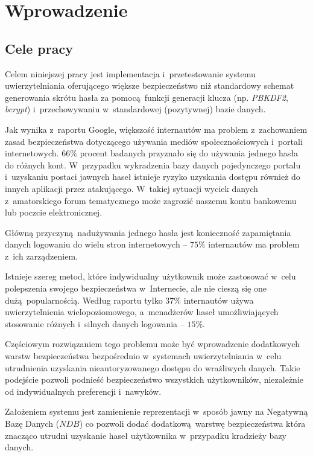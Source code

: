 \chapter{Wprowadzenie}
\section{Cele pracy}
Celem niniejszej pracy jest implementacja i~przetestowanie systemu uwierzytelniania oferującego większe bezpieczeństwo
niż standardowy schemat generowania skrótu hasła za pomocą funkcji generacji klucza (np. \textit{PBKDF2}, \textit{bcrypt})
i~przechowywaniu w~standardowej (pozytywnej) bazie danych.
    
Jak wynika z~raportu Google\cite{google-poll}, większość internautów ma problem z~zachowaniem zasad bezpieczeństwa dotyczącego 
używania mediów społecznościowych i~portali internetowych. $66\%$ procent badanych przyznało się do używania jednego hasła do różnych kont. 
W~przypadku wykradzenia bazy danych pojedynczego portalu i~uzyskaniu postaci jawnych haseł istnieje ryzyko uzyskania dostępu również do innych aplikacji
przez atakującego. W~takiej sytuacji wyciek danych z~amatorskiego forum tematycznego może zagrozić naszemu kontu bankowemu lub poczcie elektronicznej.

Główną przyczyną nadużywania jednego hasła jest konieczność zapamiętania danych logowaniu do wielu stron internetowych -- $75\%$ internautów ma problem z~ich zarządzeniem.
  
Istnieje szereg metod, które indywidualny użytkownik może zastosować w~celu polepszenia swojego bezpieczeństwa w~Internecie, ale nie cieszą
się one dużą popularnością. Według raportu tylko $37\%$ internautów używa uwierzytelnienia wielopoziomowego, a~menadżerów haseł
umożliwiających stosowanie różnych i~silnych danych logowania -- $15\%$.

Częściowym rozwiązaniem tego problemu może być wprowadzenie dodatkowych warstw bezpieczeństwa bezpośrednio w~systemach uwierzytelniania
w~celu utrudnienia uzyskania nieautoryzowanego dostępu do wrażliwych danych. Takie podejście pozwoli podnieść bezpieczeństwo wszystkich użytkowników,
niezależnie od indywidualnych preferencji i~nawyków.
 
Założeniem systemu jest zamienienie reprezentacji w~sposób jawny na Negatywną Bazę Danych ($NDB$) co pozwoli dodać 
dodatkową warstwę bezpieczeństwa która znacząco utrudni uzyskanie haseł użytkownika w~przypadku kradzieży bazy danych.

